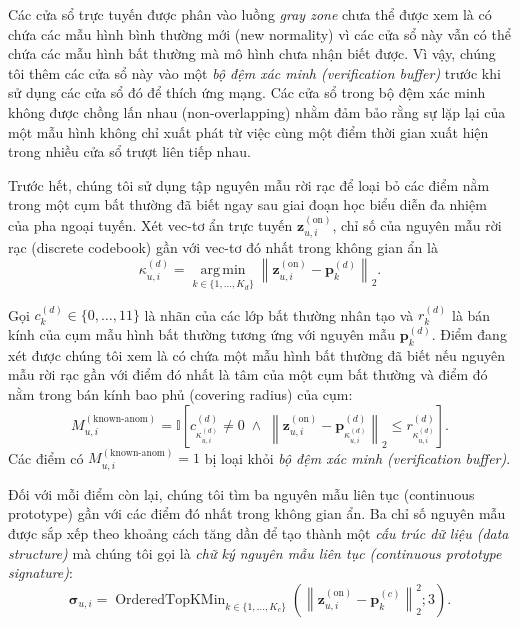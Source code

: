 Các cửa sổ trực tuyến được phân vào luồng \textit{gray zone} chưa thể được xem là có chứa các mẫu hình bình thường mới (new normality) vì các cửa sổ này vẫn có thể chứa các mẫu hình bất thường mà mô hình chưa nhận biết được. Vì vậy, chúng tôi thêm các cửa sổ này vào một \textit{bộ đệm xác minh (verification buffer)} trước khi sử dụng các cửa sổ đó để thích ứng mạng. Các cửa sổ trong bộ đệm xác minh không được chồng lấn nhau (non-overlapping) nhằm đảm bảo rằng sự lặp lại của một mẫu hình không chỉ xuất phát từ việc cùng một điểm thời gian xuất hiện trong nhiều cửa sổ trượt liên tiếp nhau.

Trước hết, chúng tôi sử dụng tập nguyên mẫu rời rạc để loại bỏ các điểm nằm trong một cụm bất thường đã biết ngay sau giai đoạn học biểu diễn đa nhiệm của pha ngoại tuyến. Xét vec-tơ ẩn trực tuyến \(\mathbf{z}^{(\mathrm{on})}_{u,i}\), chỉ số của nguyên mẫu rời rạc (discrete codebook) gần với vec-tơ đó nhất trong không gian ẩn là
\begin{equation}
\kappa^{(d)}_{u,i}
=
\underset{k\in\{1,\ldots,K_d\}}{\operatorname{arg\,min}}
\left\|
\mathbf{z}^{(\mathrm{on})}_{u,i}
-
\mathbf{p}^{(d)}_k
\right\|_2.
\end{equation}

Gọi \(c^{(d)}_k\in\{0,\ldots,11\}\) là nhãn của các lớp bất thường nhân tạo và
\(r^{(d)}_k\) là bán kính của cụm mẫu hình bất thường tương ứng với nguyên mẫu \(\mathbf{p}^{(d)}_k\). Điểm đang xét được chúng tôi xem là có chứa một mẫu hình bất thường đã biết nếu nguyên mẫu rời rạc gần với điểm đó nhất là tâm của một cụm bất thường và điểm đó
nằm trong bán kính bao phủ (covering radius) của cụm:
\begin{equation}
M^{(\mathrm{known\text{-}anom})}_{u,i}
=
\mathbb{I}
\left[
c^{(d)}_{\kappa^{(d)}_{u,i}}\neq 0
\;\land\;
\left\|
\mathbf{z}^{(\mathrm{on})}_{u,i}
-
\mathbf{p}^{(d)}_{\kappa^{(d)}_{u,i}}
\right\|_2
\leq
r^{(d)}_{\kappa^{(d)}_{u,i}}
\right].
\end{equation}
Các điểm có
\(M^{(\mathrm{known\text{-}anom})}_{u,i}=1\) bị loại khỏi \textit{bộ đệm xác minh (verification buffer)}.

Đối với mỗi điểm còn lại, chúng tôi tìm ba nguyên mẫu liên tục (continuous prototype) gần với các điểm đó nhất trong không gian ẩn. Ba chỉ số nguyên mẫu được sắp xếp theo khoảng cách tăng dần để tạo thành một \textit{cấu trúc dữ liệu (data structure)} mà chúng tôi gọi là \textit{chữ ký nguyên mẫu liên tục (continuous prototype signature)}:
\begin{equation}
\boldsymbol{\sigma}_{u,i}
=
\operatorname{OrderedTopKMin}_{k\in\{1,\ldots,K_c\}}
\left(
\left\|
\mathbf{z}^{(\mathrm{on})}_{u,i}
-
\mathbf{p}^{(c)}_k
\right\|_2^2;
3
\right).
\end{equation}

